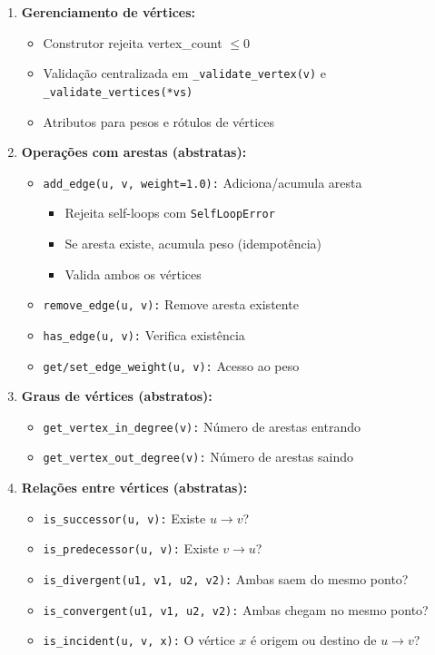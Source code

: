 \documentclass[12pt,a4paper]{article}
\begin{document}
\begin{enumerate}
  \item \textbf{Gerenciamento de vértices:}
    \begin{itemize}
      \item Construtor rejeita vertex\_count $\leq 0$
      \item Validação centralizada em \texttt{\_validate\_vertex(v)} e \texttt{\_validate\_vertices(*vs)}
      \item Atributos para pesos e rótulos de vértices
    \end{itemize}

  \item \textbf{Operações com arestas (abstratas):}
    \begin{itemize}
      \item \texttt{add\_edge(u, v, weight=1.0):} Adiciona/acumula aresta
        \begin{itemize}
          \item Rejeita self-loops com \texttt{SelfLoopError}
          \item Se aresta existe, acumula peso (idempotência)
          \item Valida ambos os vértices
        \end{itemize}
      \item \texttt{remove\_edge(u, v):} Remove aresta existente
      \item \texttt{has\_edge(u, v):} Verifica existência
      \item \texttt{get/set\_edge\_weight(u, v):} Acesso ao peso
    \end{itemize}

  \item \textbf{Graus de vértices (abstratos):}
    \begin{itemize}
      \item \texttt{get\_vertex\_in\_degree(v):} Número de arestas entrando
      \item \texttt{get\_vertex\_out\_degree(v):} Número de arestas saindo
    \end{itemize}

  \item \textbf{Relações entre vértices (abstratas):}
    \begin{itemize}
      \item \texttt{is\_successor(u, v):} Existe $u \to v$?
      \item \texttt{is\_predecessor(u, v):} Existe $v \to u$?
      \item \texttt{is\_divergent(u1, v1, u2, v2):} Ambas saem do mesmo ponto?
      \item \texttt{is\_convergent(u1, v1, u2, v2):} Ambas chegam no mesmo ponto?
      \item \texttt{is\_incident(u, v, x):} O vértice $x$ é origem ou destino de $u \to v$?
    \end{itemize}


\end{enumerate}
\end{document}
